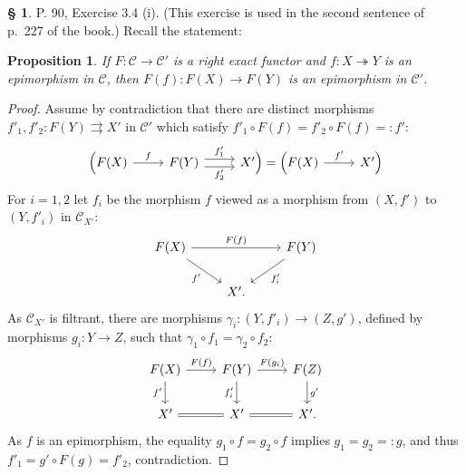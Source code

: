 \documentclass[12pt]{article}
\newtheorem{prop}[thm]{Proposition}
\theoremstyle{remark}
\theoremstyle{definition}
\newtheorem{s}[thm]{\S}
\newcommand{\C}{\mathcal C}
\newcommand{\epi}{\twoheadrightarrow}
\begin{document}
\begin{s} 
P. 90, Exercise 3.4 (i). (This exercise is used in the second sentence of p.~227 of the book.) Recall the statement: 
%
\begin{prop}\label{34i}
If $F:\C\to\C'$ is a right exact functor and $f:X\epi Y$ is an epimorphism in $\C$, then $F(f):F(X)\to F(Y)$ is an epimorphism in $\C'$.
\end{prop}
%
\begin{proof}
Assume by contradiction that there are distinct morphisms $f'_1,f'_2:F(Y)\rightrightarrows X'$ in $\C'$ which satisfy $f'_1\circ F(f)=f'_2\circ F(f)=:f'$:
$$
\begin{tikzcd}
\Big(F(X)\ar{r}{f}&F(Y)\ar[yshift=.7ex]{r}{f'_1}\ar[yshift=-.7ex]{r}[swap]{f'_2}&X'\Big)=\Big(F(X)\ar{r}{f'}&X'\Big)
\end{tikzcd}
$$ 
For $i=1,2$ let $f_i$ be the morphism $f$ viewed as a morphism from $(X,f')$ to $(Y,f'_i)$ in $\C_{X'}$: 
$$
\begin{tikzcd}
F(X)\ar{dr}[swap]{f'}\ar{rr}{F(f)}&&F(Y)\ar{dl}{f'_i}\\ 
{}&X'.
\end{tikzcd}
$$
As $\C_{X'}$ is filtrant, there are morphisms $\gamma_i:(Y,f'_i)\to(Z,g')$, defined by morphisms $g_i:Y\to Z$, such that $\gamma_1\circ f_1=\gamma_2\circ f_2$:
$$
\begin{tikzcd}
F(X)\ar{d}[swap]{f'}\ar{r}{F(f)}&F(Y)\ar{d}[swap]{f'_i}\ar{r}{F(g_i)}&F(Z)\ar{d}{g'}\\ 
X'\ar[equal]{r}&X'\ar[equal]{r}&X'.
\end{tikzcd}
$$
As $f$ is an epimorphism, the equality $g_1\circ f=g_2\circ f$ implies $g_1=g_2=:g$, and thus $f'_1=g'\circ F(g)=f'_2$, contradiction.
\end{proof}
\end{s}
%
%
\end{document}
